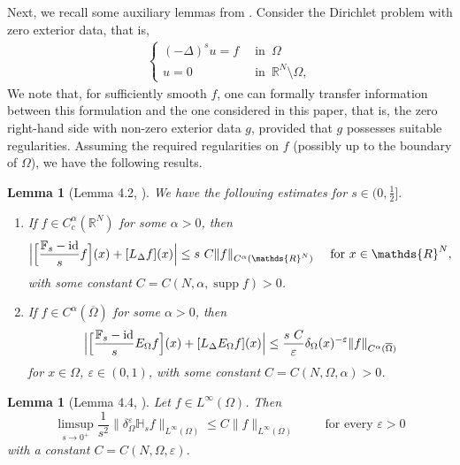 \documentclass[notitlepage,11pt,reqno]{amsart}
\newtheorem{lemma}[theorem]{Lemma}
\theoremstyle{definition}
\numberwithin{equation}{section}
\newcommand{\cHs}{{\mathbb H}}
\newcommand{\cFs}{{\mathbb F}}
\newcommand{\RRN}{\mathds{R}^{N}}
\newcommand{\RR}{\mathds{R}}
\DeclareMathOperator*{\supp}{supp}
\begin{document}
Next, we recall some auxiliary lemmas from \cite{JSW20}. Consider the Dirichlet problem with zero exterior data, that is,
\begin{align*}
 \begin{cases}
    (-\Delta)^s u =f\,\,\, &\text{in}\,\,\, \Omega\\
    u=0\,\,\, &\text{in}\,\,\, \RRN\setminus\Omega,
\end{cases}   
\end{align*}
We note that, for sufficiently smooth $f$, one can formally transfer information between this formulation and the one considered in this paper, that is, the zero right-hand side with non-zero exterior data $g$, provided that $g$ possesses suitable regularities. Assuming the required regularities on $f$ (possibly up to the boundary of $\Omega$),  we have the following results.
 \begin{lemma}[Lemma 4.2, \cite{JSW20}]\label{Lem: lemma 4.1}We have the following estimates for $s \in (0, \frac{1}{2}].$\hspace{1em}
  \begin{enumerate}
  \item[(i)] If $f\in C^{\alpha}_c(\RR^N)$ for some $\alpha>0$, then  
    \begin{equation*}
      \label{eq:rn-case-first-claim}
\Big|\Bigl[\frac{\cFs_s-\textnormal{id}}{s}f\Bigr] (x)+[L_{\Delta} f](x)\Big|\leq s\ C \|f\|_{C^{\alpha}(\RR^N)}\quad\text{ for $x\in \RR^N,$}
    \end{equation*}
with some constant $C= C(N,\alpha,\supp f)>0$.
\item[(ii)] If $f\in C^{\alpha}(\overline{\Omega})$ for some $\alpha>0$, then 
  \begin{equation}
    \label{eq:rn-case-second-claim}
\Big|\Bigl[\frac{\cFs_s-\textnormal{id}}{s}E_{\Omega} f\Bigr] (x)+[L_{\Delta} E_{\Omega} f](x)\Big|\leq \frac{s\ C}{\varepsilon} \delta_{\Omega}(x)^{-\varepsilon}\|f\|_{C^{\alpha}(\overline{\Omega})}
\end{equation}
for $x\in \Omega$, $\varepsilon \in (0,1)$, with some constant $C=C(N,\Omega,\alpha)>0$.
  \end{enumerate}
\end{lemma} 

\begin{lemma}[Lemma 4.4, \cite{JSW20}]\label{Lem: lemma 4.2}
Let $f\in L^\infty(\Omega)$. Then 
\[
\limsup_{s \to 0^+} \frac{1}{s^2}\|\delta_{\Omega}^\varepsilon \cHs_s f\|_{L^\infty(\Omega)} \le C \|f\|_{L^\infty(\Omega)}\qquad \text{ for every $\varepsilon>0$}
\]
with a constant $C=C(N,\Omega,\varepsilon)$.
\end{lemma}
\end{document}
